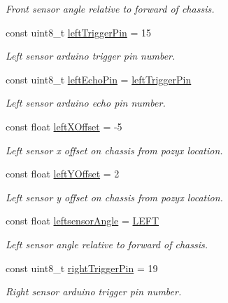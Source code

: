 \begin{DoxyCompactItemize}
\begin{DoxyCompactList}\small\item\em Front sensor angle relative to forward of chassis. \end{DoxyCompactList}\item 
const uint8\+\_\+t \mbox{\hyperlink{bot_main_8ino_a297d5238270dc0d92e1a65b016a79f2e}{left\+Trigger\+Pin}} = 15
\begin{DoxyCompactList}\small\item\em Left sensor arduino trigger pin number. \end{DoxyCompactList}\item 
const uint8\+\_\+t \mbox{\hyperlink{bot_main_8ino_a203479aa2174a6eedd63da361e6e302c}{left\+Echo\+Pin}} = \mbox{\hyperlink{bot_main_8ino_a297d5238270dc0d92e1a65b016a79f2e}{left\+Trigger\+Pin}}
\begin{DoxyCompactList}\small\item\em Left sensor arduino echo pin number. \end{DoxyCompactList}\item 
const float \mbox{\hyperlink{bot_main_8ino_a2d121af61e2977de12f5bfbbe8559dca}{left\+X\+Offset}} = -\/5
\begin{DoxyCompactList}\small\item\em Left sensor x offset on chassis from pozyx location. \end{DoxyCompactList}\item 
const float \mbox{\hyperlink{bot_main_8ino_a7be9826e4f54e376321bcdea4177a8ed}{left\+Y\+Offset}} = 2
\begin{DoxyCompactList}\small\item\em Left sensor y offset on chassis from pozyx location. \end{DoxyCompactList}\item 
const float \mbox{\hyperlink{bot_main_8ino_a8be5324bad65fa0bad41e0c70066a958}{leftsensor\+Angle}} = \mbox{\hyperlink{bot_main_8ino_a437ef08681e7210d6678427030446a54}{L\+E\+FT}}
\begin{DoxyCompactList}\small\item\em Left sensor angle relative to forward of chassis. \end{DoxyCompactList}\item 
const uint8\+\_\+t \mbox{\hyperlink{bot_main_8ino_a906054d9d48970211789ac841d331898}{right\+Trigger\+Pin}} = 19
\begin{DoxyCompactList}\small\item\em Right sensor arduino trigger pin number. \end{DoxyCompactList}\item 

\end{DoxyCompactItemize}
